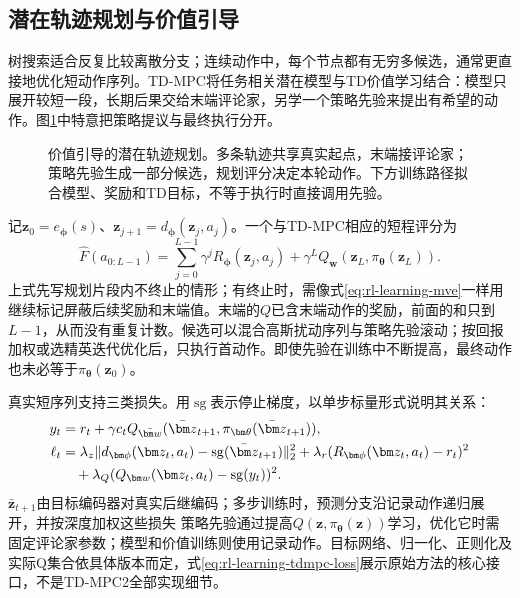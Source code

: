 \subsection{潜在轨迹规划与价值引导}
\label{sec:rl-learning-tdmpc}

树搜索适合反复比较离散分支；连续动作中，每个节点都有无穷多候选，通常更直接地优化短动作序列。TD-MPC将任务相关潜在模型与TD价值学习结合：模型只展开较短一段，长期后果交给末端评论家，另学一个策略先验来提出有希望的动作。图\ref{fig:rl-learning-tdmpc}中特意把策略提议与最终执行分开。

\begin{figure}[t]
  \centering
  
  \caption{价值引导的潜在轨迹规划。多条轨迹共享真实起点，末端接评论家；策略先验生成一部分候选，规划评分决定本轮动作。下方训练路径拟合模型、奖励和TD目标，不等于执行时直接调用先验。}
  \label{fig:rl-learning-tdmpc}
\end{figure}

记$\bm z_0=e_{\bm\phi}(s)$、$\bm z_{j+1}=d_{\bm\phi}(\bm z_j,a_j)$。一个与TD-MPC相应的短程评分为
\[
  \widehat F(a_{0:L-1})
  =\sum_{j=0}^{L-1}\gamma^j R_{\bm\phi}(\bm z_j,a_j)
      +\gamma^L Q_{\bm w}(\bm z_L,\pi_{\bm\theta}(\bm z_L)).
\]
上式先写规划片段内不终止的情形；有终止时，需像式\eqref{eq:rl-learning-mve}一样用继续标记屏蔽后续奖励和末端值。末端的$Q$已含末端动作的奖励，前面的和只到$L-1$，从而没有重复计数。候选可以混合高斯扰动序列与策略先验滚动；按回报加权或选精英迭代优化后，只执行首动作。即使先验在训练中不断提高，最终动作也未必等于$\pi_{\bm\theta}(\bm z_0)$。

真实短序列支持三类损失。用$\operatorname{sg}$表示停止梯度，以单步标量形式说明其关系：
\begin{align}
  y_t&=r_t+\gamma c_t
      Q_{\bar{\bm w}}(\bar{\bm z}_{t+1},
                             \pi_{\bm\theta}(\bar{\bm z}_{t+1})), \notag\\
  \ell_t&=\lambda_z\|
        d_{\bm\phi}(\bm z_t,a_t)-\operatorname{sg}(\bar{\bm z}_{t+1})
                              \|_2^2
       +\lambda_r(R_{\bm\phi}(\bm z_t,a_t)-r_t)^2 \notag\\
       &\quad+\lambda_Q(Q_{\bm w}(\bm z_t,a_t)
                                      -\operatorname{sg}(y_t))^2.
  \label{eq:rl-learning-tdmpc-loss}
\end{align}
$\bar{\bm z}_{t+1}$由目标编码器对真实后继编码；多步训练时，预测分支沿记录动作递归展开，并按深度加权这些损失
策略先验通过提高$Q(\bm z,\pi_{\bm\theta}(\bm z))$学习，优化它时需固定评论家参数；模型和价值训练则使用记录动作。目标网络、归一化、正则化及实际Q集合依具体版本而定，式\eqref{eq:rl-learning-tdmpc-loss}展示原始方法的核心接口，不是TD-MPC2全部实现细节。

